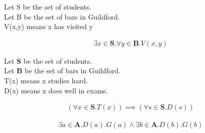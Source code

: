 \documentclass{article}
\begin{document}
Let S be the set of students.\\
Let B be the set of bars in Guildford.\\  
V(x,y) means x has visited y

\begin{align*}  
\exists x \in \mathbf{S}. \forall y \in \mathbf{B}.V(x,y)
\end{align*}

Let $\mathbf{S}$ be the set of students. \\
Let $\mathbf{B}$ be the set of bars in Guildford. \\
T(x) means x studies hard. \\
D(x) means x does well in exams.

\begin{align*}
(\forall x \in \mathbf{S}.T(x)) \implies (\forall s \in \mathbf{S}.D(s))  
\end{align*}

\begin{align*}
\exists a \in \mathbf{A}.D(a).G(a) \land \exists b \in \mathbf{A}.D(b).G(b)
\end{align*}
\end{document}
